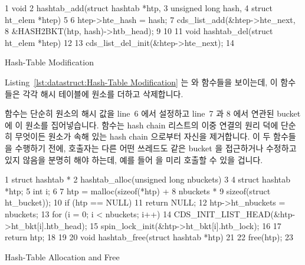 \begin{listing}[tb]
{ \scriptsize
\begin{verbbox}
 1 void
 2 hashtab_add(struct hashtab *htp,
 3             unsigned long hash,
 4             struct ht_elem *htep)
 5 {
 6   htep->hte_hash = hash;
 7   cds_list_add(&htep->hte_next,
 8                &HASH2BKT(htp, hash)->htb_head);
 9 }
10 
11 void hashtab_del(struct ht_elem *htep)
12 {
13   cds_list_del_init(&htep->hte_next);
14 }
\end{verbbox}
}
\centering
\theverbbox
\caption{Hash-Table Modification}
\label{lst:datastruct:Hash-Table Modification}
\end{listing}

Listing~\ref{lst:datastruct:Hash-Table Modification}
는  와  함수들을 보이는데, 이 함수들은 각각
해시 테이블에 원소를 더하고 삭제합니다.

 함수는 단순히 원소의 해시 값을 line~6 에서 설정하고 line~7
과 8 에서 연관된 bucket 에 이 원소를 집어넣습니다.
 함수는 hash chain 리스트의 이중 연결의 원리 덕에 단순히
무엇이든 원소가 속해 있는 hash chain 으로부터 자신을 제거합니다.
이 두 함수들을 수행하기 전에, 호출자는 다른 어떤 쓰레드도 같은 bucket 을
접근하거나 수정하고 있지 않음을 분명히 해야 하는데, 예를 들어
 을 미리 호출할 수 있을 겁니다.

\begin{listing}[tb]
{ \scriptsize
\begin{verbbox}
 1 struct hashtab *
 2 hashtab_alloc(unsigned long nbuckets)
 3 {
 4   struct hashtab *htp;
 5   int i;
 6 
 7   htp = malloc(sizeof(*htp) +
 8                nbuckets *
 9                sizeof(struct ht_bucket));
10   if (htp == NULL)
11     return NULL;
12   htp->ht_nbuckets = nbuckets;
13   for (i = 0; i < nbuckets; i++) {
14     CDS_INIT_LIST_HEAD(&htp->ht_bkt[i].htb_head);
15     spin_lock_init(&htp->ht_bkt[i].htb_lock);
16   }
17   return htp;
18 }
19 
20 void hashtab_free(struct hashtab *htp)
21 {
22   free(htp);
23 }
\end{verbbox}
}
\centering
\theverbbox
\caption{Hash-Table Allocation and Free}
\label{lst:datastruct:Hash-Table Allocation and Free}
\end{listing}

